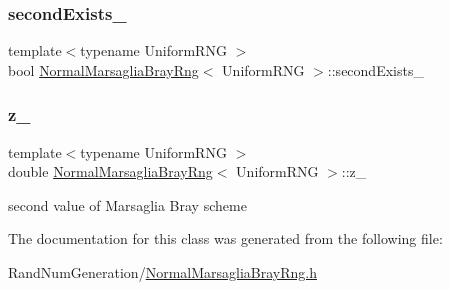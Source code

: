 \hypertarget{class_normal_marsaglia_bray_rng_a6b795b729e795b1b81aa1b30d5dfe8ef}{}\label{class_normal_marsaglia_bray_rng_a6b795b729e795b1b81aa1b30d5dfe8ef} 
\subsubsection{\texorpdfstring{second\+Exists\+\_\+}{secondExists\_}}
{\footnotesize\ttfamily template$<$typename Uniform\+R\+NG $>$ \\
bool \hyperlink{class_normal_marsaglia_bray_rng}{Normal\+Marsaglia\+Bray\+Rng}$<$ Uniform\+R\+NG $>$\+::second\+Exists\+\_\+\hspace{0.3cm}{\ttfamily [private]}}

\hypertarget{class_normal_marsaglia_bray_rng_a6d021a285cd0eb2d95c25cdb8af0ee93}{}\label{class_normal_marsaglia_bray_rng_a6d021a285cd0eb2d95c25cdb8af0ee93} 
\subsubsection{\texorpdfstring{z\+\_\+}{z\_}}
{\footnotesize\ttfamily template$<$typename Uniform\+R\+NG $>$ \\
double \hyperlink{class_normal_marsaglia_bray_rng}{Normal\+Marsaglia\+Bray\+Rng}$<$ Uniform\+R\+NG $>$\+::z\+\_\+\hspace{0.3cm}{\ttfamily [private]}}



second value of Marsaglia Bray scheme 



The documentation for this class was generated from the following file\+:\begin{DoxyCompactItemize}
\item 
Rand\+Num\+Generation/\hyperlink{_normal_marsaglia_bray_rng_8h}{Normal\+Marsaglia\+Bray\+Rng.\+h}\end{DoxyCompactItemize}
